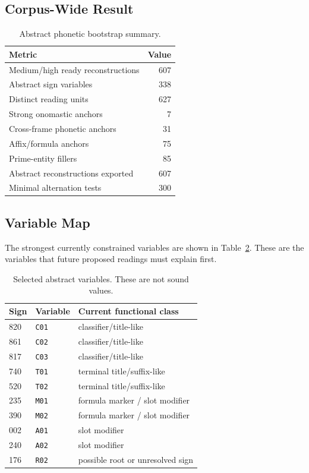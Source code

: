 \subsection{Corpus-Wide Result}

\begin{table}[htbp]
\centering
\begin{tabular}{lr}
\toprule
\textbf{Metric} & \textbf{Value} \\
\midrule
Medium/high ready reconstructions & 607 \\
Abstract sign variables & 338 \\
Distinct reading units & 627 \\
Strong onomastic anchors & 7 \\
Cross-frame phonetic anchors & 31 \\
Affix/formula anchors & 75 \\
Prime-entity fillers & 85 \\
Abstract reconstructions exported & 607 \\
Minimal alternation tests & 300 \\
\bottomrule
\end{tabular}
\caption{Abstract phonetic bootstrap summary.}
\label{tab:phonetic-bootstrap-summary}
\end{table}

\subsection{Variable Map}

The strongest currently constrained variables are shown in Table~\ref{tab:phonetic-variable-map}. These are the variables that future proposed readings must explain first.

\begin{table}[htbp]
\centering
\begin{tabular}{lll}
\toprule
\textbf{Sign} & \textbf{Variable} & \textbf{Current functional class} \\
\midrule
820 & \texttt{C01} & classifier/title-like \\
861 & \texttt{C02} & classifier/title-like \\
817 & \texttt{C03} & classifier/title-like \\
740 & \texttt{T01} & terminal title/suffix-like \\
520 & \texttt{T02} & terminal title/suffix-like \\
235 & \texttt{M01} & formula marker / slot modifier \\
390 & \texttt{M02} & formula marker / slot modifier \\
002 & \texttt{A01} & slot modifier \\
240 & \texttt{A02} & slot modifier \\
176 & \texttt{R02} & possible root or unresolved sign \\
\bottomrule
\end{tabular}
\caption{Selected abstract variables. These are not sound values.}
\label{tab:phonetic-variable-map}
\end{table}

